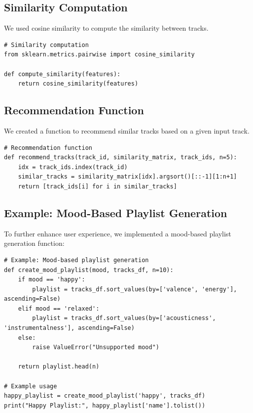 \documentclass[runningheads]{llncs}
\begin{document}
\subsection{Similarity Computation}

We used cosine similarity to compute the similarity between tracks.

\begin{verbatim}
# Similarity computation
from sklearn.metrics.pairwise import cosine_similarity

def compute_similarity(features):
    return cosine_similarity(features)
\end{verbatim}

\subsection{Recommendation Function}

We created a function to recommend similar tracks based on a given input track.

\begin{verbatim}
# Recommendation function
def recommend_tracks(track_id, similarity_matrix, track_ids, n=5):
    idx = track_ids.index(track_id)
    similar_tracks = similarity_matrix[idx].argsort()[::-1][1:n+1]
    return [track_ids[i] for i in similar_tracks]
\end{verbatim}

\subsection{Example: Mood-Based Playlist Generation}

To further enhance user experience, we implemented a mood-based playlist generation function:

\begin{verbatim}
# Example: Mood-based playlist generation
def create_mood_playlist(mood, tracks_df, n=10):
    if mood == 'happy':
        playlist = tracks_df.sort_values(by=['valence', 'energy'], ascending=False)
    elif mood == 'relaxed':
        playlist = tracks_df.sort_values(by=['acousticness', 'instrumentalness'], ascending=False)
    else:
        raise ValueError("Unsupported mood")
    
    return playlist.head(n)

# Example usage
happy_playlist = create_mood_playlist('happy', tracks_df)
print("Happy Playlist:", happy_playlist['name'].tolist())
\end{verbatim}
\end{document}
